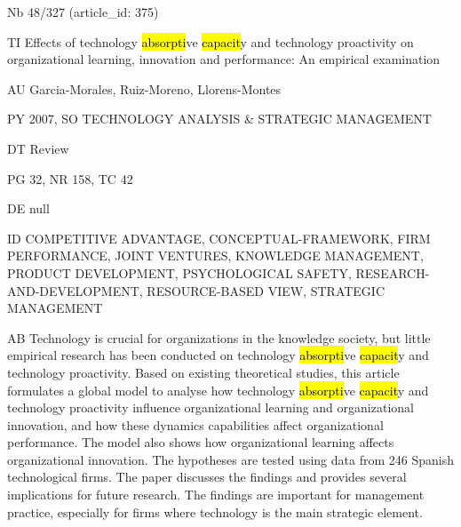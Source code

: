 \documentclass[a4paper]{article}
\begin{document}
\vspace*{-2cm}
Nb \tabto{0cm}48/327 (article\_id: 375)\par
TI \tabto{0cm}Effects of technology \hl{absorpti}ve \hl{capacit}y and technology proactivity on organizational learning, innovation and performance: An empirical examination\par
AU \tabto{0cm}Garcia-Morales, Ruiz-Moreno, Llorens-Montes\par
PY \tabto{0cm}2007, SO TECHNOLOGY ANALYSIS \& STRATEGIC MANAGEMENT\par
DT \tabto{0cm}Review\par
PG \tabto{0cm}32, NR 158, TC 42\par
DE \tabto{0cm}null\par
ID \tabto{0cm}COMPETITIVE ADVANTAGE, CONCEPTUAL-FRAMEWORK, FIRM PERFORMANCE, JOINT VENTURES, KNOWLEDGE MANAGEMENT, PRODUCT DEVELOPMENT, PSYCHOLOGICAL SAFETY, RESEARCH-AND-DEVELOPMENT, RESOURCE-BASED VIEW, STRATEGIC MANAGEMENT\par
AB \tabto{0cm}Technology is crucial for organizations in the knowledge society, but little empirical research has been conducted on technology \hl{absorpti}ve \hl{capacit}y and technology proactivity. Based on existing theoretical studies, this article formulates a global model to analyse how technology \hl{absorpti}ve \hl{capacit}y and technology proactivity influence organizational learning and organizational innovation, and how these dynamics capabilities affect organizational performance. The model also shows how organizational learning affects organizational innovation. The hypotheses are tested using data from 246 Spanish technological firms. The paper discusses the findings and provides several implications for future research. The findings are important for management practice, especially for firms where technology is the main strategic element.\par
\clearpage
\end{document}
